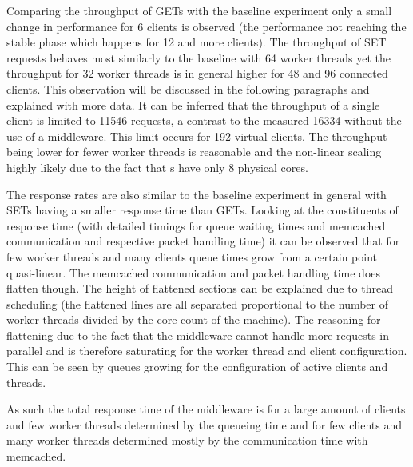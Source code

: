             Comparing the throughput of GETs with the baseline experiment only a small change in performance for 6
            clients is observed (the performance not reaching the stable phase which happens for 12 and more clients).
            The throughput of SET requests behaves most similarly to the baseline with 64 worker threads yet the
            throughput for 32 worker threads is in general higher for 48 and 96 connected clients. This observation will
            be discussed in the following paragraphs and explained with more data. It can be inferred that the
            throughput of a single client is limited to 11546 requests, a contrast to the measured 16334 without the use
            of a middleware. This limit occurs for 192 virtual clients. The throughput being lower for fewer worker
            threads is reasonable and the non-linear scaling highly likely due to the fact that \mw{}s have only 8
            physical cores.

            The response rates are also similar to the baseline experiment in general with SETs having a smaller
            response time than GETs. Looking at the constituents of response time (with detailed timings for queue
            waiting times and memcached communication and respective packet handling time) it can be observed that for
            few worker threads and many clients queue times grow from a certain point quasi-linear. The memcached
            communication and packet handling time does flatten though. The height of flattened sections can be
            explained due to thread scheduling (the flattened lines are all separated proportional to the number of
            worker threads divided by the core count of the machine). The reasoning for flattening due to the fact that
            the middleware cannot handle more requests in parallel and is therefore saturating for the worker thread and
            client configuration. This can be seen by queues growing for the configuration of active clients and
            threads.

            As such the total response time of the middleware is for a large amount of clients and few worker threads
            determined by the queueing time and for few clients and many worker threads determined mostly by the
            communication time with memcached.

